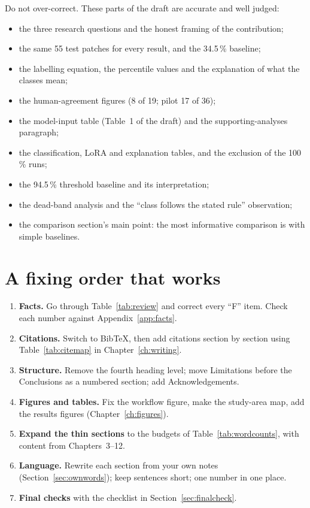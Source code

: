 Do not over-correct. These parts of the draft are accurate and well judged:
\begin{itemize}
  \item the three research questions and the honest framing of the contribution;
  \item the same 55 test patches for every result, and the 34.5\,\% baseline;
  \item the labelling equation, the percentile values and the explanation of what the classes mean;
  \item the human-agreement figures (8 of 19; pilot 17 of 36);
  \item the model-input table (Table~1 of the draft) and the supporting-analyses paragraph;
  \item the classification, LoRA and explanation tables, and the exclusion of the 100\,\% runs;
  \item the 94.5\,\% threshold baseline and its interpretation;
  \item the dead-band analysis and the ``class follows the stated rule'' observation;
  \item the comparison section's main point: the most informative comparison is with simple baselines.
\end{itemize}

\section{A fixing order that works}

\begin{enumerate}
  \item \textbf{Facts.} Go through Table~\ref{tab:review} and correct every ``F'' item. Check each number against Appendix~\ref{app:facts}.
  \item \textbf{Citations.} Switch to BibTeX, then add citations section by section using Table~\ref{tab:citemap} in Chapter~\ref{ch:writing}.
  \item \textbf{Structure.} Remove the fourth heading level; move Limitations before the Conclusions as a numbered section; add Acknowledgements.
  \item \textbf{Figures and tables.} Fix the workflow figure, make the study-area map, add the results figures (Chapter~\ref{ch:figures}).
  \item \textbf{Expand the thin sections} to the budgets of Table~\ref{tab:wordcounts}, with content from Chapters~3--12.
  \item \textbf{Language.} Rewrite each section from your own notes (Section~\ref{sec:ownwords}); keep sentences short; one number in one place.
  \item \textbf{Final checks} with the checklist in Section~\ref{sec:finalcheck}.
\end{enumerate}

